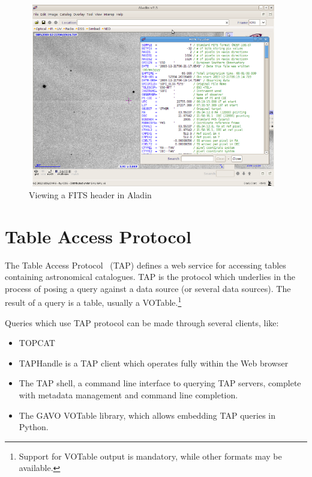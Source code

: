\begin{figure}[tb]
\centering
\includegraphics[width=11cm,height=8cm]{images/fits_header.png}
\caption{Viewing a FITS header in Aladin}
\end{figure}


\section{Table Access Protocol} %
\label{sec:table_access_protocol}

The Table Access Protocol~\cite{2010tap..irec.....D} (TAP) defines a web service for accessing tables containing astronomical catalogues. TAP is the protocol which underlies in the process of posing a query against a data source (or several data sources). The result of a query is a table, usually a VOTable.\footnote{Support for VOTable output is mandatory, while other formats may be available.}  

Queries which use TAP protocol can be made through several clients, like:
\begin{itemize}
\item TOPCAT
\item TAPHandle
is a TAP client
 which operates fully within the Web browser
\item The TAP shell, a command line interface to querying TAP servers, complete with metadata management and command line completion.
\item The GAVO VOTable library, which allows embedding TAP queries in Python.
\end{itemize}

